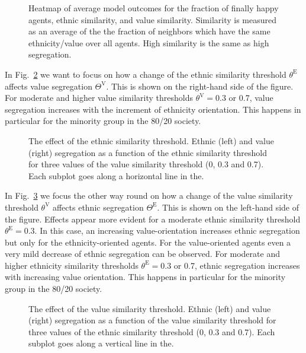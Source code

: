 \documentclass{ws-acs}
\begin{document}
{\begin{figure}[th]
\centerline{}
\vspace*{8pt}
\caption{Heatmap of average model outcomes for the fraction of finally happy agents, ethnic similarity, and value similarity. Similarity is measured as an average of the the fraction of neighbors which have the same ethnicity/value over all agents. High similarity is the same as high segregation.}
\label{fig:Heatmap}
\end{figure}

In Fig.~\ref{fig:Detail1} we want to focus on how a change of the ethnic similarity threshold $\theta^\text{E}$ affects value segregation $\Theta^\text{V}$. This is shown on the right-hand side of the figure. For moderate and higher value similarity thresholds $\theta^\text{V}=0.3$ or 0.7, value segregation increases with the increment of  ethnicity orientation. This happens in particular for the minority group in the 80/20 society. 


\begin{figure}[th]
\centerline{}
\vspace*{8pt}
\caption{The effect of the ethnic similarity threshold. Ethnic (left) and value (right) segregation as a function of the ethnic similarity threshold for three values of the value similarity threshold (0, 0.3 and 0.7). Each subplot goes along a horizontal line in the.}
\label{fig:Detail1}
\end{figure}

In Fig.~\ref{fig:Detail2} we focus the other way round on how a change of the value similarity threshold $\theta^\text{V}$ affects ethnic segregation $\Theta^\text{E}$. This is shown on the left-hand side of the figure. Effects appear more evident for a moderate ethnic similarity threshold $\theta^\text{E} = 0.3$. In this case, an increasing value-orientation increases ethnic segregation but only for the ethnicity-oriented agents. For the value-oriented agents even a very mild decrease of ethnic segregation can be observed. For moderate and higher ethnicity similarity thresholds $\theta^\text{E}=0.3$ or 0.7, ethnic segregation increases with increasing value orientation. This happens in particular for the minority group in the 80/20 society.

\begin{figure}[th]
\centerline{}
\vspace*{8pt}
\caption{The effect of the value similarity threshold. Ethnic (left) and value (right) segregation as a function of the value similarity threshold for three values of the ethnic similarity threshold (0, 0.3 and 0.7). Each subplot goes along a vertical line in the.}
\label{fig:Detail2}
\end{figure}

}
\end{document}
